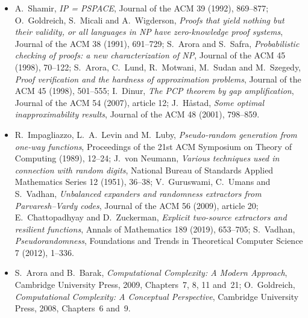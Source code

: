\begin{itemize}
\item A.~Shamir, \emph{IP = PSPACE}, Journal of the ACM 39 (1992), 869--877; O.~Goldreich, S.~Micali and A.~Wigderson, \emph{Proofs that yield nothing but their validity, or all languages in NP have zero-knowledge proof systems}, Journal of the ACM 38 (1991), 691--729; S.~Arora and S.~Safra, \emph{Probabilistic checking of proofs: a new characterization of NP}, Journal of the ACM 45 (1998), 70--122; S.~Arora, C.~Lund, R.~Motwani, M.~Sudan and M.~Szegedy, \emph{Proof verification and the hardness of approximation problems}, Journal of the ACM 45 (1998), 501--555; I.~Dinur, \emph{The PCP theorem by gap amplification}, Journal of the ACM 54 (2007), article 12; J.~Håstad, \emph{Some optimal inapproximability results}, Journal of the ACM 48 (2001), 798--859.
\item R.~Impagliazzo, L.~A.~Levin and M.~Luby, \emph{Pseudo-random generation from one-way functions}, Proceedings of the 21st ACM Symposium on Theory of Computing (1989), 12--24; J.~von Neumann, \emph{Various techniques used in connection with random digits}, National Bureau of Standards Applied Mathematics Series 12 (1951), 36--38; V.~Guruswami, C.~Umans and S.~Vadhan, \emph{Unbalanced expanders and randomness extractors from Parvaresh--Vardy codes}, Journal of the ACM 56 (2009), article 20; E.~Chattopadhyay and D.~Zuckerman, \emph{Explicit two-source extractors and resilient functions}, Annals of Mathematics 189 (2019), 653--705; S.~Vadhan, \emph{Pseudorandomness}, Foundations and Trends in Theoretical Computer Science 7 (2012), 1--336.
\item S.~Arora and B.~Barak, \emph{Computational Complexity: A Modern Approach}, Cambridge University Press, 2009, Chapters~7, 8, 11 and~21; O.~Goldreich, \emph{Computational Complexity: A Conceptual Perspective}, Cambridge University Press, 2008, Chapters~6 and~9.
\end{itemize}
